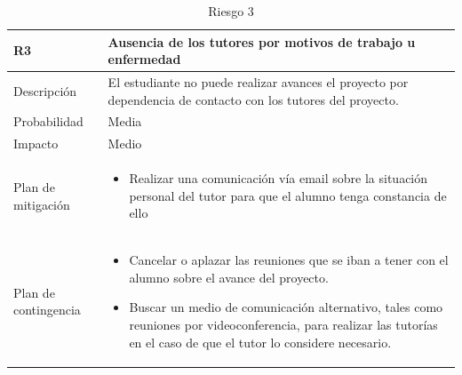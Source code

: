 \begin{table}[!htb]
    \footnotesize
    \begin{tabular}{|>{\arraybackslash}m{3.15cm} | >{\arraybackslash}m{10cm} |}
        \hline
        \vspace{0.5em} \textbf{ R3 } \vspace{0.5em} & \vspace{0.5em} \textbf{Ausencia de los tutores por motivos de trabajo u enfermedad} \vspace{0.5em} \\
        \hline 
        \vspace{0.5em} Descripción \vspace{0.5em} & \vspace{0.5em} El estudiante no puede realizar avances el proyecto por dependencia de contacto con los tutores del proyecto. \vspace{0.5em} \\
        \hline
        \vspace{0.5em} Probabilidad \vspace{0.5em} & \vspace{0.5em} Media \vspace{0.5em} \\
        \hline
        \vspace{0.5em} Impacto \vspace{0.5em} & \vspace{0.5em} Medio \vspace{0.5em} \\
        \hline
        Plan de mitigación & 
        \begin{itemize}
            \item Realizar una comunicación vía email sobre la situación personal del tutor para que el alumno tenga constancia de ello
        \end{itemize} \\
        \hline
        Plan de contingencia & 
        \begin{itemize}
            \item Cancelar o aplazar las reuniones que se iban a tener con el alumno sobre el avance del proyecto.
            \item Buscar un medio de comunicación alternativo, tales como reuniones por videoconferencia, para realizar las tutorías en el caso de que el tutor lo considere necesario.
        \end{itemize} \\
        \hline
    \end{tabular}
    \caption{Riesgo 3}
    \label{tabla:riesgo3}
\end{table}

